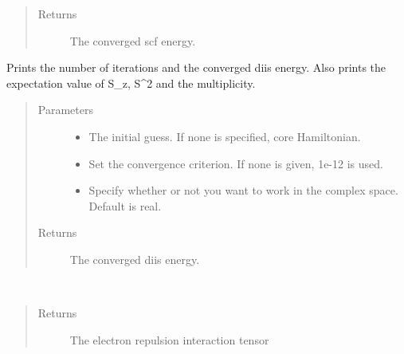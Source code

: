 \documentclass[letterpaper,10pt,english]{sphinxmanual}
\begin{document}
\begin{fulllineitems}
\begin{fulllineitems}
\begin{quote}
\begin{description}
\item[{Returns}] \leavevmode
The converged scf energy.

\end{description}\end{quote}

\end{fulllineitems}


\begin{fulllineitems}
\label{\detokenize{UHF:hf.UHF.UHF.get_scf_solution_diis}}
Prints the number of iterations and the converged diis energy.
Also prints the expectation value of S\_z, S\textasciicircum{}2 and the multiplicity.
\begin{quote}\begin{description}
\item[{Parameters}] \leavevmode\begin{itemize}
\item {} 
 \textendash{} The initial guess. If none is specified, core Hamiltonian.

\item {} 
 \textendash{} Set the convergence criterion. If none is given, 1e-12 is used.

\item {} 
 \textendash{} Specify whether or not you want to work in the complex space. Default is real.

\end{itemize}

\item[{Returns}] \leavevmode
The converged diis energy.

\end{description}\end{quote}

\end{fulllineitems}


\begin{fulllineitems}
\label{\detokenize{UHF:hf.UHF.UHF.get_two_e}}~\begin{quote}\begin{description}
\item[{Returns}] \leavevmode
The electron repulsion interaction tensor


\end{description}
\end{quote}
\end{fulllineitems}
\end{fulllineitems}
\end{document}

